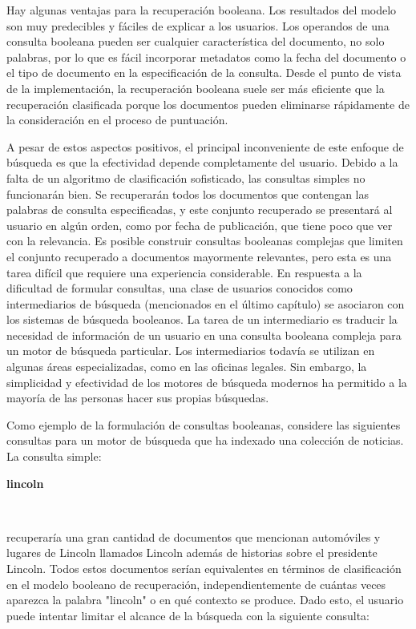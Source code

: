 Hay algunas ventajas para la recuperación booleana. Los resultados del modelo son muy predecibles y fáciles de explicar a los usuarios. Los operandos de una consulta booleana pueden ser cualquier característica del documento, no solo palabras, por lo que es fácil incorporar metadatos como la fecha del documento o el tipo de documento en la especificación de la consulta. Desde el punto de vista de la implementación, la recuperación booleana suele ser más eficiente que la recuperación clasificada porque los documentos pueden eliminarse rápidamente de la consideración en el proceso de puntuación.


A pesar de estos aspectos positivos, el principal inconveniente de este enfoque de búsqueda es que la efectividad depende completamente del usuario. Debido a la falta de un algoritmo de clasificación sofisticado, las consultas simples no funcionarán bien. Se recuperarán todos los documentos que contengan las palabras de consulta especificadas, y este conjunto recuperado se presentará al usuario en algún orden, como por fecha de publicación, que tiene poco que ver con la relevancia. Es posible construir consultas booleanas complejas que limiten el conjunto recuperado a documentos mayormente relevantes, pero esta es una tarea difícil que requiere una experiencia considerable. En respuesta a la dificultad de formular consultas, una clase de usuarios conocidos como intermediarios de búsqueda (mencionados en el último capítulo) se asociaron con los sistemas de búsqueda booleanos. La tarea de un intermediario es traducir la necesidad de información de un usuario en una consulta booleana compleja para un motor de búsqueda particular. Los intermediarios todavía se utilizan en algunas áreas especializadas, como en las oficinas legales. Sin embargo, la simplicidad y efectividad de los motores de búsqueda modernos ha permitido a la mayoría de las personas hacer sus propias búsquedas. 

Como ejemplo de la formulación de consultas booleanas, considere las siguientes consultas para un motor de búsqueda que ha indexado una colección de noticias. La consulta simple:

\begin{center}
	\begin{minipage}{13cm}	
		\textbf{lincoln}\\
	\end{minipage}\\
\end{center}


recuperaría una gran cantidad de documentos que mencionan automóviles y lugares de Lincoln llamados Lincoln además de historias sobre el presidente Lincoln. Todos estos documentos serían equivalentes en términos de clasificación en el modelo booleano de recuperación, independientemente de cuántas veces aparezca la palabra "lincoln" o en qué contexto se produce. Dado esto, el usuario puede intentar limitar el alcance de la búsqueda con la siguiente consulta:

